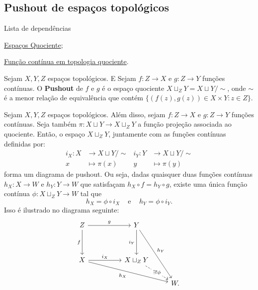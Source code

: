 \subsection{Pushout de espaços topológicos} %
\label{pushout-de-espacos-topologicos-def}
\begin{titlemize}{Lista de dependências}
	\item \hyperref[topologia-quociente-def]{Espaços Quociente};\\ %
    \item \hyperref[funcao-continua-em-topologia-quociente-prop]{Função contínua em topologia quociente}.
\end{titlemize}

\begin{defi}
    Sejam $X,Y,Z$ espaços topológicos. E Sejam $f:Z\rightarrow X$ e $g:Z\rightarrow Y$ funções contínuas. O \textbf{Pushout} de $f$ e $g$ é o espaço quociente $X\sqcup_Z Y=X\sqcup Y/\sim$, onde $\sim$ é a menor relação de equivalência que contém $\{(f(z),g(z))\in X\times Y:z\in Z\}$. 
\end{defi}

\begin{prop}
    Sejam $X,Y,Z$ espaços topológicos. Além disso, sejam $f:Z\rightarrow X$ e $g:Z\rightarrow Y$ funções contínuas. Seja também $\pi:X\sqcup Y\rightarrow X\sqcup_Z Y$ a função projeção associada ao quociente. Então, o espaço $X\sqcup_Z Y$, juntamente com as funções contínuas definidas por:
    \begin{align*}
        i_X:X &\longrightarrow X\sqcup Y/\sim & i_Y:Y&\longrightarrow X\sqcup Y/\sim\\
        x&\longmapsto \pi(x) & y &\longmapsto \pi(y)
    \end{align*}
    forma um diagrama de pushout. Ou seja, dadas quaisquer duas funções contínuas $h_X:X\rightarrow W$ e $h_Y:Y\rightarrow W$ que satisfaçam $h_X\circ f=h_Y\circ g$, existe uma única função contínua 
    $\phi:X\sqcup_Z Y\rightarrow W$ tal que 
    $$h_X=\phi\circ i_X \;\;\;\text{ e }\;\;\; h_Y=\phi\circ i_Y.$$ 
    Isso é ilustrado no diagrama seguinte:
\[\begin{tikzcd}
	Z && Y \\
	\\
	X && {X\sqcup_Z Y} \\
	&&& W.
	\arrow["g", from=1-1, to=1-3]
	\arrow["f"', from=1-1, to=3-1]
	\arrow["{i_Y}"', from=1-3, to=3-3]
	\arrow["{h_Y}", from=1-3, to=4-4]
	\arrow["{i_X}", from=3-1, to=3-3]
	\arrow["{h_X}"', from=3-1, to=4-4]
	\arrow["{\exists! \phi}"{description}, dashed, from=3-3, to=4-4]
\end{tikzcd}\]
\end{prop}


